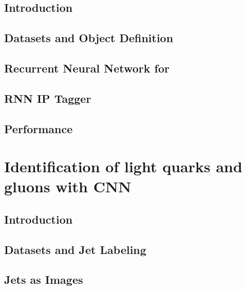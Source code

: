 \documentclass{report}
\begin{document}
\section{Introduction}

\clearpage

\section{Datasets and Object Definition}

\clearpage

\section{Recurrent Neural Network for \btagging}

\clearpage

\section{RNN IP Tagger}

\clearpage

\section{Performance}


\clearpage


\chapter{Identification of light quarks and gluons with CNN}
\label{chap:qgtagging}
\section{Introduction}


\clearpage

\section{Datasets and Jet Labeling}

\clearpage

\section{Jets as Images}

\clearpage

%
\end{document}

